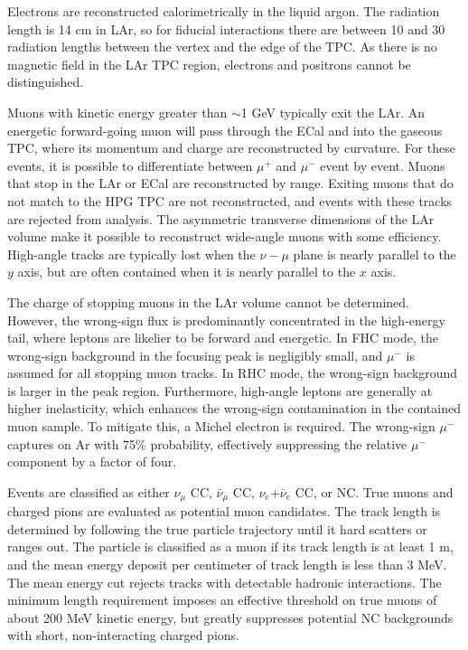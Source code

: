 Electrons are reconstructed calorimetrically in the liquid argon. The radiation length is 14 cm in LAr, so for fiducial interactions there are between 10 and 30 radiation lengths between the vertex and the edge of the TPC. As there is no magnetic field in the LAr TPC region, electrons and positrons cannot be distinguished.

Muons with kinetic energy greater than $\sim$1 GeV typically exit the LAr. An energetic forward-going muon will pass through the ECal and into the gaseous TPC, where its momentum and charge are reconstructed by curvature. For these events, it is possible to differentiate between $\mu^{+}$ and $\mu^{-}$ event by event. Muons that stop in the LAr or ECal are reconstructed by range. Exiting muons that do not match to the HPG TPC are not reconstructed, and events with these tracks are rejected from analysis. The asymmetric transverse dimensions of the LAr volume make it possible to reconstruct wide-angle muons with some efficiency. High-angle tracks are typically lost when the $\nu-\mu$ plane is nearly parallel to the $y$ axis, but are often contained when it is nearly parallel to the $x$ axis. 

The charge of stopping muons in the LAr volume cannot be determined. However, the wrong-sign flux is predominantly concentrated in the high-energy tail, where leptons are likelier to be forward and energetic. In FHC mode, the wrong-sign background in the focusing peak is negligibly small, and $\mu^{-}$ is assumed for all stopping muon tracks. In RHC mode, the wrong-sign background is larger in the peak region. Furthermore, high-angle leptons are generally at higher inelasticity, which enhances the wrong-sign contamination in the contained muon sample. To mitigate this, a Michel electron is required. The wrong-sign $\mu^{-}$ captures on Ar with 75\% probability, effectively suppressing the relative $\mu^{-}$ component by a factor of four.

Events are classified as either $\nu_{\mu}$ CC, $\bar{\nu}_{\mu}$ CC, $\nu_{e}$+$\bar{\nu}_{e}$ CC, or NC. True muons and charged pions are evaluated as potential muon candidates. The track length is determined by following the true particle trajectory until it hard scatters or ranges out. The particle is classified as a muon if its track length is at least 1 m, and the mean energy deposit per centimeter of track length is less than 3 MeV. The mean energy cut rejects tracks with detectable hadronic interactions. The minimum length requirement imposes an effective threshold on true muons of about 200 MeV kinetic energy, but greatly suppresses potential NC backgrounds with short, non-interacting charged pions.

